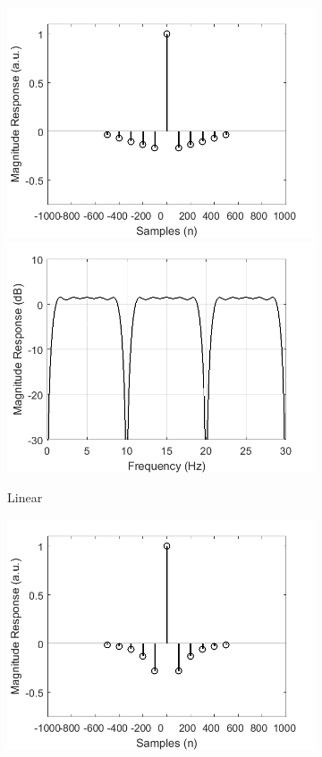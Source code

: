 \documentclass[a4paper]{article}
\begin{document}
\begin{figure}[hbtp]
\begin{subfigure}{.245\textwidth}
        \includegraphics[width=\textwidth]{img/sym/kernel_linear.png}\\
        \includegraphics[width=\textwidth]{img/sym/mag_linear.png}
        \caption{Linear}\label{fig:LinearSymKernel}
    \end{subfigure}
    \begin{subfigure}{.245\textwidth}
        \includegraphics[width=\textwidth]{img/sym/kernel_exp.png}\\

\end{subfigure}
\end{figure}
\end{document}
